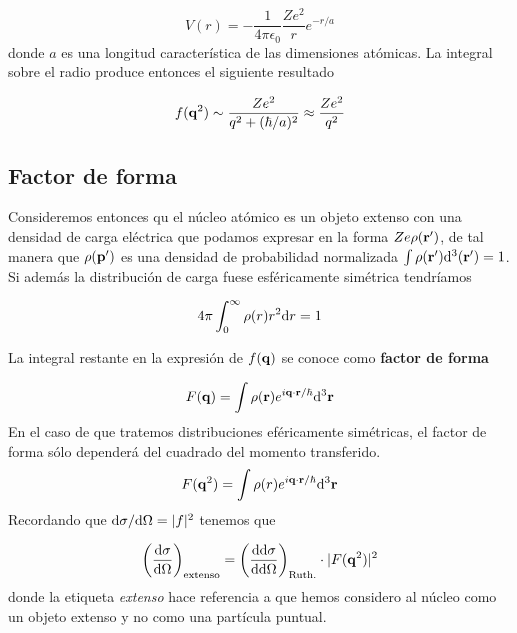 \begin{equation}
    V(r) =  - \frac{1}{4 \pi \epsilon_0} \frac{Ze^2}{r} e^{-r/a}
\end{equation}
donde $a$ es una longitud característica de las dimensiones atómicas. La integral sobre el radio produce entonces el siguiente resultado

\begin{equation}
    f(\mathbf{q}^2) \sim \frac{Ze^2}{q^2+(\hbar/a)^2} \approx \frac{Ze^2}{q^2}
\end{equation}



\subsection{Factor de forma}

Consideremos entonces qu el núcleo atómico es un objeto extenso con una densidad de carga eléctrica que podamos expresar en la forma $Ze\rho (\mathbf{r}')$, de tal manera que $\rho(\mathbf{p}')$ es una densidad de probabilidad normalizada $\int \rho (\mathbf{r}') \mathrm{d}^3 (\mathbf{r}')=1$. Si además la distribución de carga fuese esféricamente simétrica tendríamos

\begin{equation}
	4 \pi \int_0^\infty \rho (r) r^2 \mathrm{d} r = 1
\end{equation}


La integral restante en la expresión de $f(\mathbf{q})$ se conoce como \textbf{factor de forma}

\begin{equation}
    F(\mathbf{q}) = \int \rho (\mathbf{r}) e^{i \mathbf{q} \cdot \mathbf{r} / \hbar} \mathrm{d}^3 \mathbf{r}
\end{equation}
En el caso de que tratemos distribuciones eféricamente simétricas, el factor de forma sólo dependerá del cuadrado del momento transferido.
\begin{equation}
    F(\mathbf{q}^2) = \int \rho (r) e^{i \mathbf{q} \cdot \mathbf{r} / \hbar} \mathrm{d}^3 \mathbf{r}
\end{equation}
Recordando que $\mathrm{d} \sigma / \mathrm{d} \Omega = |f|^2$ tenemos que

\begin{equation}
    \left( \frac{\mathrm{d} \sigma}{\mathrm{d} \Omega} \right)_{\text{extenso}} = \left( \frac{\mathrm{d} \mathrm{d} \sigma}{\mathrm{d} \mathrm{d} \Omega} \right)_{\text{Ruth.}} \cdot |F(\mathbf{q}^2)|^2
\end{equation} 
donde la etiqueta \textit{extenso} hace referencia a que hemos considero al núcleo como un objeto extenso y no como una partícula puntual. 


